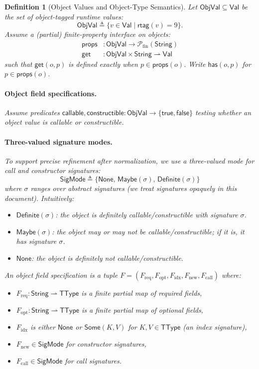 \documentclass[11pt]{article}
\newtheorem{definition}[theorem]{Definition}
\newcommand{\ObjVal}{\mathsf{ObjVal}}
\newcommand{\String}{\mathsf{String}}
\newcommand{\TType}{\mathsf{TType}}
\newcommand{\rtag}{\mathsf{rtag}}
\newcommand{\Val}{\mathsf{Val}}
\begin{document}
\begin{definition}[Object Values and Object-Type Semantics]
\label{def:object-semantics}
Let $\ObjVal \subseteq \Val$ be the set of object-tagged runtime values:
\[
\ObjVal \triangleq \{ v \in \Val \mid \rtag(v)=9\}.
\]
Assume a (partial) finite-property interface on objects:
\begin{align*}
\mathsf{props} &: \ObjVal \to \mathcal{P}_{\mathrm{fin}}(\String) \\
\mathsf{get} &: \ObjVal \times \String \rightharpoonup \Val
\end{align*}
such that $\mathsf{get}(o,p)$ is defined exactly when $p \in \mathsf{props}(o)$.
Write $\mathsf{has}(o,p)$ for $p \in \mathsf{props}(o)$.

\paragraph{Object field specifications.}
Assume predicates $\mathsf{callable}, \mathsf{constructible} : \ObjVal \to \{\mathsf{true},\mathsf{false}\}$ testing whether an object value is callable or constructible.

\paragraph{Three-valued signature modes.}
To support precise refinement after normalization, we use a three-valued mode for call and constructor signatures:
\[
\mathsf{SigMode} \triangleq \{\mathsf{None},\, \mathsf{Maybe}(\sigma),\, \mathsf{Definite}(\sigma)\}
\]
where $\sigma$ ranges over abstract signatures (we treat signatures opaquely in this document).
Intuitively:
\begin{itemize}
\item $\mathsf{Definite}(\sigma)$: the object is definitely callable/constructible with signature $\sigma$.
\item $\mathsf{Maybe}(\sigma)$: the object may or may not be callable/constructible; if it is, it has signature $\sigma$.
\item $\mathsf{None}$: the object is definitely not callable/constructible.
\end{itemize}

An \emph{object field specification} is a tuple $F=(F_{\mathrm{req}},F_{\mathrm{opt}},F_{\mathrm{idx}},F_{\mathrm{new}},F_{\mathrm{call}})$ where:
\begin{itemize}
\item $F_{\mathrm{req}} : \String \rightharpoonup \TType$ is a finite partial map of required fields,
\item $F_{\mathrm{opt}} : \String \rightharpoonup \TType$ is a finite partial map of optional fields,
\item $F_{\mathrm{idx}}$ is either $\mathsf{None}$ or $\mathsf{Some}(K,V)$ for $K,V \in \TType$ (an index signature),
\item $F_{\mathrm{new}} \in \mathsf{SigMode}$ for constructor signatures,
\item $F_{\mathrm{call}} \in \mathsf{SigMode}$ for call signatures.
\end{itemize}


\end{definition}
\end{document}
